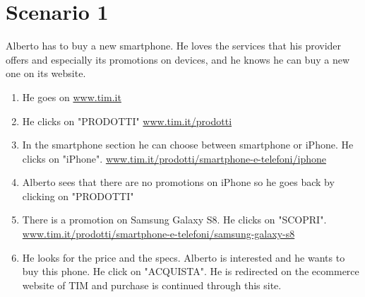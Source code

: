 \section{Scenario 1}
Alberto has to buy a new smartphone. He loves the services that his provider offers and especially its promotions on devices, and he knows he can buy a new one on its website.

\begin{enumerate}
	\item He goes on \url{www.tim.it}
	\item He clicks on "PRODOTTI" \url{www.tim.it/prodotti}
	\item In the smartphone section he can choose between smartphone or iPhone. He clicks on "iPhone". \url{www.tim.it/prodotti/smartphone-e-telefoni/iphone}
	\item Alberto sees that there are no promotions on iPhone so he goes back by clicking on "PRODOTTI"
	\item There is a promotion on Samsung Galaxy S8. He clicks on "SCOPRI". \url{www.tim.it/prodotti/smartphone-e-telefoni/samsung-galaxy-s8}
	\item He looks for the price and the specs. Alberto is interested and he wants to buy this phone. He click on "ACQUISTA". He is redirected on the ecommerce website of TIM and purchase is continued through this site.
\end{enumerate}

